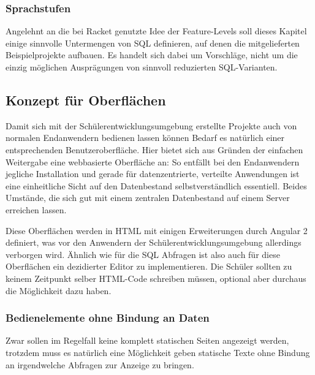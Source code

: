 \subsubsection{Sprachstufen}
\label{sec:sql-subset-ranks}

Angelehnt an die bei Racket genutzte Idee der Feature-Levels soll dieses Kapitel einige sinnvolle Untermengen von SQL definieren, auf denen die mitgelieferten Beispielprojekte aufbauen. Es handelt sich dabei um Vorschläge, nicht um die einzig möglichen Ausprägungen von sinnvoll reduzierten SQL-Varianten.


\subsection{Konzept für Oberflächen}
\label{sec:design-ui-editor}

Damit sich mit der Schülerentwicklungsumgebung erstellte Projekte auch von normalen Endanwendern bedienen lassen können Bedarf es natürlich einer entsprechenden Benutzeroberfläche. Hier bietet sich aus Gründen der einfachen Weitergabe eine webbasierte Oberfläche an: So entfällt bei den Endanwendern jegliche Installation und gerade für datenzentrierte, verteilte Anwendungen ist eine einheitliche Sicht auf den Datenbestand selbstverständlich essentiell. Beides Umstände, die sich gut mit einem zentralen Datenbestand auf einem Server erreichen lassen.

Diese Oberflächen werden in HTML mit einigen Erweiterungen durch Angular 2 definiert, was vor den Anwendern der Schülerentwicklungsumgebung allerdings verborgen wird. Ähnlich wie für die SQL Abfragen ist also auch für diese Oberflächen ein dezidierter Editor zu implementieren. Die Schüler sollten zu keinem Zeitpunkt selber HTML-Code schreiben müssen, optional aber durchaus die Möglichkeit dazu haben.

\subsubsection{Bedienelemente ohne Bindung an Daten}

Zwar sollen im Regelfall keine komplett statischen Seiten angezeigt werden, trotzdem muss es natürlich eine Möglichkeit geben statische Texte ohne Bindung an irgendwelche Abfragen zur Anzeige zu bringen.

